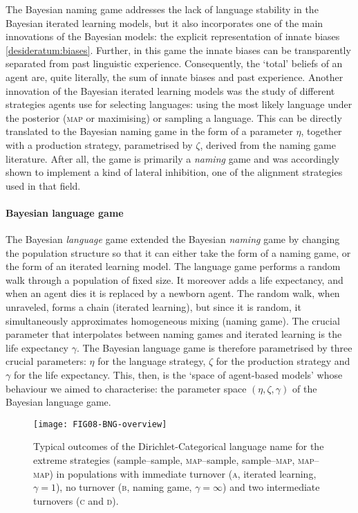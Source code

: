 \documentclass{../src/bcthesispart}
\begin{document}
The Bayesian naming game addresses the lack of language stability in the Bayesian iterated learning models, but it also incorporates one of the main innovations of the Bayesian models: 
the explicit representation of innate biases \ref{desideratum:biases}.
Further, in this game the innate biases can be transparently separated from past linguistic experience.
Consequently, the ‘total’ beliefs of an agent are, quite literally, the sum of innate biases and past experience.
Another innovation of the Bayesian iterated learning models was the study of different strategies agents use for selecting languages: using the most likely language under the posterior (\textsc{map} or maximising) or sampling a language. 
This can be directly translated to the Bayesian naming game in the form of a parameter $\eta$, together with a production strategy, parametrised by $\zeta$, derived from the naming game literature.
After all, the game is primarily a \emph{naming} game and was accordingly shown to implement a kind of lateral inhibition, one of the alignment strategies used in that field.




\paragraph{Bayesian language game}

The Bayesian \emph{language} game extended the Bayesian \emph{naming} game by changing the population structure so that it can either take the form of a  naming game, or the form of an iterated learning model.
The language game performs a random walk through a population of fixed size.
It moreover adds a life expectancy, and when an agent dies it is replaced by a newborn agent.
The random walk, when unraveled, forms a chain (iterated learning), but since it is random, it simultaneously approximates homogeneous mixing (naming game).
The crucial parameter that interpolates between naming games and iterated learning is the life expectancy $\gamma$.
The Bayesian language game is therefore parametrised by three crucial parameters: $\eta$ for the language strategy, $\zeta$ for the production strategy and $\gamma$ for the life expectancy.
This, then, is the ‘space of agent-based models’ whose behaviour we aimed to characterise: the parameter space $(\eta, \zeta, \gamma)$ of the Bayesian language game.




\begin{SCfigure}
	\texttt{[image: FIG08-BNG-overview]}
	
	\caption{%
	Typical outcomes of the Dirichlet-Categorical language name for the extreme strategies 
	(sample--sample, \textsc{map}--sample, sample--\textsc{map}, \textsc{map--map}) in populations with 
	immediate turnover (\textsc{a}, iterated learning, $\gamma=1$), 
	no turnover (\textsc{b}, naming game, $\gamma=\infty$) 
	and two intermediate turnovers (\textsc{c} and \textsc{d}).
	\label{fig:ch7:FIG08-bng-overview}}
\end{SCfigure}
\end{document}
